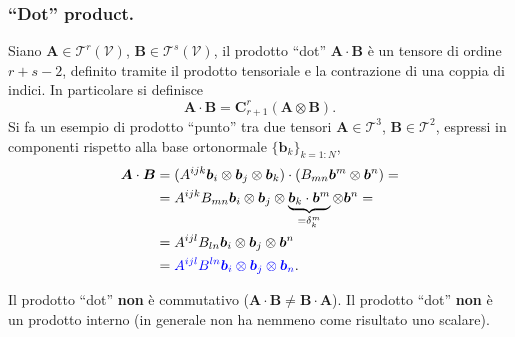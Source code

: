  \subsubsection{``Dot'' product.} Siano $\bm{A} \in \mathcal{T}^r(\mathcal{V})$, $\bm{B} \in \mathcal{T}^s(\mathcal{V})$, il
 prodotto ``dot'' $\bm{A} \cdot \bm{B}$ è un tensore di ordine $r+s-2$, definito tramite il prodotto tensoriale e la contrazione di una coppia di indici.
 In particolare si definisce 
 \begin{equation}
  \bm{A} \cdot \bm{B} = \bm{C}^{r}_{r+1} (\bm{A} \otimes \bm{B}) .
 \end{equation}
Si fa un esempio di prodotto ``punto'' tra due tensori $\bm{A} \in \mathcal{T}^3$, $\bm{B} \in \mathcal{T}^2$, espressi in componenti rispetto alla base ortonormale $\{\bm{b}_k\}_{k=1:N}$,
 \begin{equation}
 \begin{aligned}
  \bm{A} \cdot \bm{B} & = (A^{ijk} \bm{b}_i \otimes \bm{b}_j \otimes \bm{b}_k) \cdot (B_{mn} \bm{b}^m \otimes \bm{b}^n) = \\
     & = A^{ijk} B_{mn} \bm{b}_i \otimes \bm{b}_j \otimes \underbrace{\bm{b}_k \cdot \bm{b}^m}_{=\delta^m_k} \otimes \bm{b}^n = \\
   & = A^{ijl} B_{ln} \bm{b}_i \otimes \bm{b}_j \otimes \bm{b}^n \\
   & = {\color{blue} A^{ijl} B^{ln} \bm{b}_i \otimes \bm{b}_j \otimes \bm{b}_n} .
 \end{aligned}
 \end{equation}
%
\begin{remark}
 Il prodotto ``dot'' \textbf{non} è commutativo ($\bm{A} \cdot \bm{B} \neq \bm{B} \cdot \bm{A}$).
 Il prodotto ``dot'' \textbf{non} è un prodotto interno (in generale non ha nemmeno come risultato uno scalare).
\end{remark}
 
